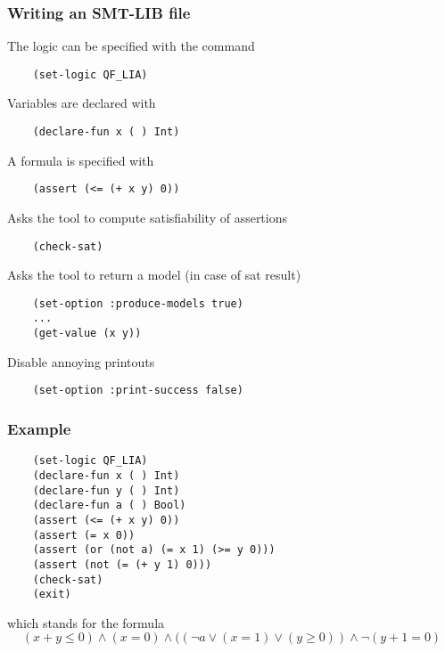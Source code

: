 \begin{frame}[fragile]
  \frametitle{Writing an SMT-LIB file} 
  \scriptsize

  The logic can be specified with the command
  \begin{verbatim}
    (set-logic QF_LIA)
  \end{verbatim}
  \vfill
  \pause
  Variables are declared with
  \begin{verbatim}
    (declare-fun x ( ) Int)
  \end{verbatim}
  \vfill
  \pause
  A formula is specified with 
  \begin{verbatim}
    (assert (<= (+ x y) 0))
  \end{verbatim}
  \vfill
  \pause
  Asks the tool to compute satisfiability of assertions
  \begin{verbatim}
    (check-sat)
  \end{verbatim}
  \vfill
  \pause
  Asks the tool to return a model (in case of sat result)
  \begin{verbatim}
    (set-option :produce-models true)
    ...
    (get-value (x y))
  \end{verbatim}
  \vfill
  \pause
  Disable annoying printouts
  \begin{verbatim}
    (set-option :print-success false)
  \end{verbatim}

\end{frame}

\begin{frame}[fragile]
  \frametitle{Example}

  \begin{verbatim}
    (set-logic QF_LIA)
    (declare-fun x ( ) Int)
    (declare-fun y ( ) Int)
    (declare-fun a ( ) Bool)
    (assert (<= (+ x y) 0))
    (assert (= x 0))
    (assert (or (not a) (= x 1) (>= y 0)))
    (assert (not (= (+ y 1) 0)))
    (check-sat)
    (exit)
  \end{verbatim} 

  which stands for the \Lia formula
  $$
  (x + y \leq 0) \wedge (x = 0) \wedge ((\neg a \vee (x = 1) \vee (y \geq 0)) \wedge \neg(y + 1 = 0)
  $$

\end{frame}
